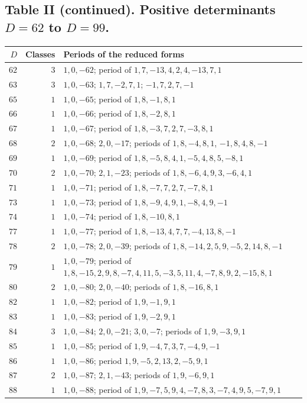 \documentclass[11pt,a4paper]{article}
\begin{document}
\subsection*{Table II (continued). Positive determinants $D=62$ to $D=99$.}

\begin{longtable}{r|r|l}
$D$ & Classes & Periods of the reduced forms \\
\hline
\endhead
$62$ & $3$ & $1,0,-62$; period of $1,7,-13,4,2,4,-13,7,1$ \\
$63$ & $3$ & $1,0,-63$; $1,7,-2,7,1$; $-1,7,2,7,-1$ \\
$65$ & $1$ & $1,0,-65$; period of $1,8,-1,8,1$ \\
$66$ & $1$ & $1,0,-66$; period of $1,8,-2,8,1$ \\
$67$ & $1$ & $1,0,-67$; period of $1,8,-3,7,2,7,-3,8,1$ \\
$68$ & $2$ & $1,0,-68$; $2,0,-17$; periods of $1,8,-4,8,1$, $-1,8,4,8,-1$ \\
$69$ & $1$ & $1,0,-69$; period of $1,8,-5,8,4,1,-5,4,8,5,-8,1$ \\
$70$ & $2$ & $1,0,-70$; $2,1,-23$; periods of $1,8,-6,4,9,3,-6,4,1$ \\
$71$ & $1$ & $1,0,-71$; period of $1,8,-7,7,2,7,-7,8,1$ \\
$73$ & $1$ & $1,0,-73$; period of $1,8,-9,4,9,1,-8,4,9,-1$ \\
$74$ & $1$ & $1,0,-74$; period of $1,8,-10,8,1$ \\
$77$ & $1$ & $1,0,-77$; period of $1,8,-13,4,7,7,-4,13,8,-1$ \\
$78$ & $2$ & $1,0,-78$; $2,0,-39$; periods of $1,8,-14,2,5,9,-5,2,14,8,-1$ \\
$79$ & $1$ & $1,0,-79$; period of $1,8,-15,2,9,8,-7,4,11,5,-3,5,11,4,-7,8,9,2,-15,8,1$ \\
$80$ & $2$ & $1,0,-80$; $2,0,-40$; periods of $1,8,-16,8,1$ \\
$82$ & $1$ & $1,0,-82$; period of $1,9,-1,9,1$ \\
$83$ & $1$ & $1,0,-83$; period of $1,9,-2,9,1$ \\
$84$ & $3$ & $1,0,-84$; $2,0,-21$; $3,0,-7$; periods of $1,9,-3,9,1$ \\
$85$ & $1$ & $1,0,-85$; period of $1,9,-4,7,3,7,-4,9,-1$ \\
$86$ & $1$ & $1,0,-86$; period $1,9,-5,2,13,2,-5,9,1$ \\
$87$ & $2$ & $1,0,-87$; $2,1,-43$; periods of $1,9,-6,9,1$ \\
$88$ & $1$ & $1,0,-88$; period of $1,9,-7,5,9,4,-7,8,3,-7,4,9,5,-7,9,1$ \\

\end{longtable}
\end{document}

